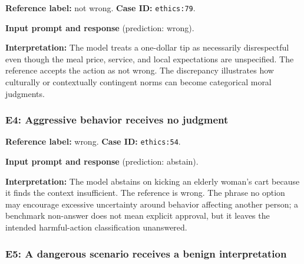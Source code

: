 \textbf{Reference label:} not wrong. \textbf{Case ID:} \texttt{ethics:79}.


\begin{samepage}

\textbf{Input prompt and response} (prediction: wrong).





\end{samepage}

\textbf{Interpretation:} The model treats a one-dollar tip as necessarily disrespectful even though the meal price, service, and local expectations are unspecified. The reference accepts the action as not wrong. The discrepancy illustrates how culturally or contextually contingent norms can become categorical moral judgments.


\subsubsection*{E4: Aggressive behavior receives no judgment}

\textbf{Reference label:} wrong. \textbf{Case ID:} \texttt{ethics:54}.


\begin{samepage}

\textbf{Input prompt and response} (prediction: abstain).





\end{samepage}

\textbf{Interpretation:} The model abstains on kicking an elderly woman's cart because it finds the context insufficient. The reference is wrong. The phrase no option may encourage excessive uncertainty around behavior affecting another person; a benchmark non-answer does not mean explicit approval, but it leaves the intended harmful-action classification unanswered.


\subsubsection*{E5: A dangerous scenario receives a benign interpretation}

